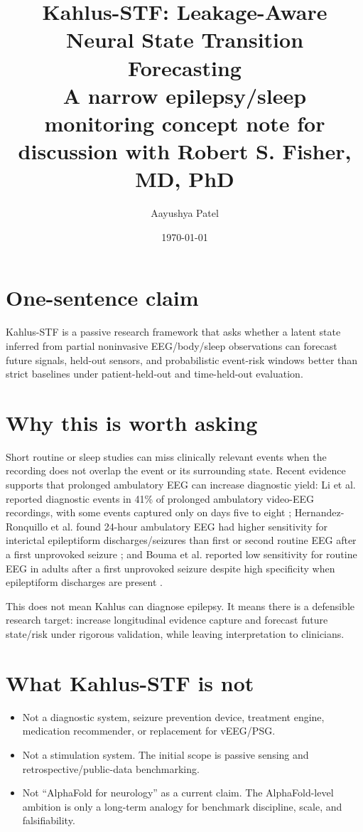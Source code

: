 \documentclass[10pt]{article}
\title{\vspace{-1.0cm}\textbf{Kahlus-STF: Leakage-Aware Neural State Transition Forecasting}\\
\large A narrow epilepsy/sleep monitoring concept note for discussion with Robert S. Fisher, MD, PhD}
\author{Aayushya Patel}
\date{\today}
\begin{document}
\maketitle

\vspace{-0.7cm}
\section*{One-sentence claim}
Kahlus-STF is a passive research framework that asks whether a latent state inferred from partial noninvasive EEG/body/sleep observations can forecast future signals, held-out sensors, and probabilistic event-risk windows better than strict baselines under patient-held-out and time-held-out evaluation.

\section*{Why this is worth asking}
Short routine or sleep studies can miss clinically relevant events when the recording does not overlap the event or its surrounding state. Recent evidence supports that prolonged ambulatory EEG can increase diagnostic yield: Li et al. reported diagnostic events in 41\% of prolonged ambulatory video-EEG recordings, with some events captured only on days five to eight \cite{li2024ambulatory}; Hernandez-Ronquillo et al. found 24-hour ambulatory EEG had higher sensitivity for interictal epileptiform discharges/seizures than first or second routine EEG after a first unprovoked seizure \cite{hernandez2023ambulatory}; and Bouma et al. reported low sensitivity for routine EEG in adults after a first unprovoked seizure despite high specificity when epileptiform discharges are present \cite{bouma2016routine}.

This does not mean Kahlus can diagnose epilepsy. It means there is a defensible research target: increase longitudinal evidence capture and forecast future state/risk under rigorous validation, while leaving interpretation to clinicians.

\section*{What Kahlus-STF is not}
\begin{itemize}
  \item Not a diagnostic system, seizure prevention device, treatment engine, medication recommender, or replacement for vEEG/PSG.
  \item Not a stimulation system. The initial scope is passive sensing and retrospective/public-data benchmarking.
  \item Not ``AlphaFold for neurology'' as a current claim. The AlphaFold-level ambition is only a long-term analogy for benchmark discipline, scale, and falsifiability.
\end{itemize}
\end{document}
